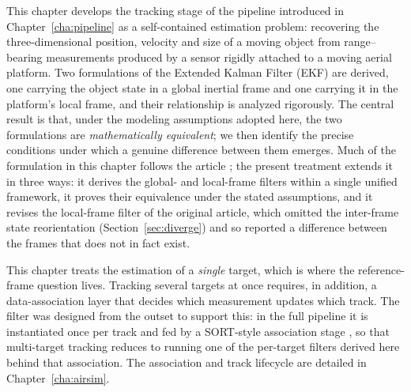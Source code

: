 
This chapter develops the tracking stage of the pipeline introduced in
Chapter~\ref{cha:pipeline} as a self-contained estimation problem: recovering the
three-dimensional position, velocity and size of a moving object from
range--bearing measurements produced by a sensor rigidly attached to a moving
aerial platform. Two formulations of the Extended Kalman Filter (EKF) are
derived, one carrying the object state in a global inertial frame and
one carrying it in the platform's local frame, and their relationship is
analyzed rigorously. The central result is that, under the modeling
assumptions adopted here, the two formulations are \emph{mathematically
equivalent}; we then identify the precise conditions under which a genuine
difference between them emerges. Much of the formulation in this chapter follows
the article \cite{delima2025fusion}; the present treatment extends it in three
ways: it derives the global- and local-frame filters within a single unified
framework, it proves their equivalence under the stated assumptions, and it
revises the local-frame filter of the original article, which omitted the
inter-frame state reorientation (Section~\ref{sec:diverge}) and so reported a
difference between the frames that does not in fact exist.

This chapter treats the estimation of a \emph{single} target, which is where the
reference-frame question lives. Tracking several targets at once requires, in
addition, a data-association layer that decides which measurement updates which
track. The filter was designed from the outset to support this: in the full
pipeline it is instantiated once per track and fed by a SORT-style association
stage \cite{bewley2016sort}, so that multi-target tracking reduces to running one
of the per-target filters derived here behind that association. The association
and track lifecycle are detailed in Chapter~\ref{cha:airsim}.

